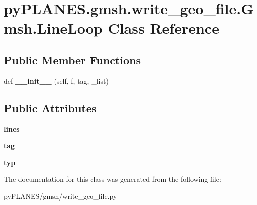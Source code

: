 \hypertarget{classpy_p_l_a_n_e_s_1_1gmsh_1_1write__geo__file_1_1_gmsh_1_1_line_loop}{}\section{py\+P\+L\+A\+N\+E\+S.\+gmsh.\+write\+\_\+geo\+\_\+file.\+Gmsh.\+Line\+Loop Class Reference}
\label{classpy_p_l_a_n_e_s_1_1gmsh_1_1write__geo__file_1_1_gmsh_1_1_line_loop}
\subsection*{Public Member Functions}
\begin{DoxyCompactItemize}
\item 
\mbox{\label{classpy_p_l_a_n_e_s_1_1gmsh_1_1write__geo__file_1_1_gmsh_1_1_line_loop_a1e86a55f796a06fdb3a50084715112ea}} 
def {\bfseries \+\_\+\+\_\+init\+\_\+\+\_\+} (self, f, tag, \+\_\+list)
\end{DoxyCompactItemize}
\subsection*{Public Attributes}
\begin{DoxyCompactItemize}
\item 
\mbox{\label{classpy_p_l_a_n_e_s_1_1gmsh_1_1write__geo__file_1_1_gmsh_1_1_line_loop_ab2f8182cd5bd3f05a55cd5f7cc61c0b7}} 
{\bfseries lines}
\item 
\mbox{\label{classpy_p_l_a_n_e_s_1_1gmsh_1_1write__geo__file_1_1_gmsh_1_1_line_loop_a3498e769049290734f535583233a33ee}} 
{\bfseries tag}
\item 
\mbox{\label{classpy_p_l_a_n_e_s_1_1gmsh_1_1write__geo__file_1_1_gmsh_1_1_line_loop_ab588405c5f5f48bbfd27766090292e8d}} 
{\bfseries typ}
\end{DoxyCompactItemize}


The documentation for this class was generated from the following file\+:\begin{DoxyCompactItemize}
\item 
py\+P\+L\+A\+N\+E\+S/gmsh/write\+\_\+geo\+\_\+file.\+py\end{DoxyCompactItemize}
